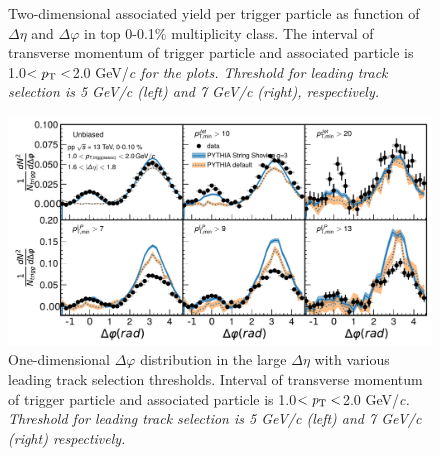 \begin{figure}[h!]
	\centering
	\caption{ Two-dimensional associated yield per trigger particle as function of $\Delta\eta$ and $\Delta\varphi$ in top 0-0.1\% multiplicity class. The interval of transverse momentum of trigger particle and associated particle is 1.0$<\it{p}_{\rm{T}}<$2.0 GeV/\it{c}\rm{} for the plots. Threshold for leading track selection is 5 GeV/\it{c}\rm{} (left) and 7 GeV/\it{c}\rm{} (right), respectively. }
\end{figure}

\begin{figure}[h!]
	\centering
	\includegraphics[width=0.99\linewidth]{./figures/Fig5_PlotDeltaPhiESE.pdf}
	\caption{One-dimensional $\Delta\varphi$ distribution in the large $\Delta\eta$ with various leading track selection thresholds. Interval of transverse momentum of trigger particle and associated particle is 1.0$<\it{p}_{\rm{T}}<$2.0 GeV/\it{c}\rm{}. Threshold for leading track selection is 5 GeV/\it{c}\rm{} (left) and 7 GeV/\it{c}\rm{} (right) respectively.}
	\label{fig:PlotDeltaPhiESE}
\end{figure}



